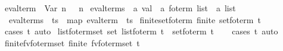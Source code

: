 \begin{isabellebody}
{\isacharbar}{\kern0pt}\ {\isachardoublequoteopen}eval{\isacharunderscore}{\kern0pt}term\ {\isasymsigma}\ {\isacharparenleft}{\kern0pt}Var\ n{\isacharparenright}{\kern0pt}\ {\isacharequal}{\kern0pt}\ {\isasymsigma}\ n{\isachardoublequoteclose}\isanewline
\isanewline
{}\isamarkupfalse%
\ eval{\isacharunderscore}{\kern0pt}terms\ {\isacharcolon}{\kern0pt}{\isacharcolon}{\kern0pt}\ {\isachardoublequoteopen}{\isacharprime}{\kern0pt}a\ val\ {\isasymRightarrow}\ {\isacharparenleft}{\kern0pt}{\isacharprime}{\kern0pt}a\ fo{\isacharunderscore}{\kern0pt}term{\isacharparenright}{\kern0pt}\ list\ {\isasymRightarrow}\ {\isacharprime}{\kern0pt}a\ list{\isachardoublequoteclose}\ {\isacharparenleft}{\kern0pt}\ {\isachardoublequoteopen}{\isasymodot}{\isachardoublequoteclose}\ {}{}{\isacharparenright}{\kern0pt}\ \isanewline
\ \ {\isachardoublequoteopen}eval{\isacharunderscore}{\kern0pt}terms\ {\isasymsigma}\ ts\ {\isacharequal}{\kern0pt}\ map\ {\isacharparenleft}{\kern0pt}eval{\isacharunderscore}{\kern0pt}term\ {\isasymsigma}{\isacharparenright}{\kern0pt}\ ts{\isachardoublequoteclose}\isanewline
\isanewline
{}\isamarkupfalse%
\ finite{\isacharunderscore}{\kern0pt}set{\isacharunderscore}{\kern0pt}fo{\isacharunderscore}{\kern0pt}term{\isacharcolon}{\kern0pt}\ {\isachardoublequoteopen}finite\ {\isacharparenleft}{\kern0pt}set{\isacharunderscore}{\kern0pt}fo{\isacharunderscore}{\kern0pt}term\ t{\isacharparenright}{\kern0pt}{\isachardoublequoteclose}\isanewline
%
\isadelimproof
\ \ %
\endisadelimproof
%
\isatagproof
{}\isamarkupfalse%
\ {\isacharparenleft}{\kern0pt}cases\ t{\isacharparenright}{\kern0pt}\ auto%
\endisatagproof
{\isafoldproof}%
%
\isadelimproof
\isanewline
%
\endisadelimproof
\isanewline
{}\isamarkupfalse%
\ list{\isacharunderscore}{\kern0pt}fo{\isacharunderscore}{\kern0pt}term{\isacharunderscore}{\kern0pt}set{\isacharcolon}{\kern0pt}\ {\isachardoublequoteopen}set\ {\isacharparenleft}{\kern0pt}list{\isacharunderscore}{\kern0pt}fo{\isacharunderscore}{\kern0pt}term\ t{\isacharparenright}{\kern0pt}\ {\isacharequal}{\kern0pt}\ set{\isacharunderscore}{\kern0pt}fo{\isacharunderscore}{\kern0pt}term\ t{\isachardoublequoteclose}\isanewline
%
\isadelimproof
\ \ %
\endisadelimproof
%
\isatagproof
{}\isamarkupfalse%
\ {\isacharparenleft}{\kern0pt}cases\ t{\isacharparenright}{\kern0pt}\ auto%
\endisatagproof
{\isafoldproof}%
%
\isadelimproof
\isanewline
%
\endisadelimproof
\isanewline
{}\isamarkupfalse%
\ finite{\isacharunderscore}{\kern0pt}fv{\isacharunderscore}{\kern0pt}fo{\isacharunderscore}{\kern0pt}term{\isacharunderscore}{\kern0pt}set{\isacharcolon}{\kern0pt}\ {\isachardoublequoteopen}finite\ {\isacharparenleft}{\kern0pt}fv{\isacharunderscore}{\kern0pt}fo{\isacharunderscore}{\kern0pt}term{\isacharunderscore}{\kern0pt}set\ t{\isacharparenright}{\kern0pt}{\isachardoublequoteclose}\isanewline

\end{isabellebody}
